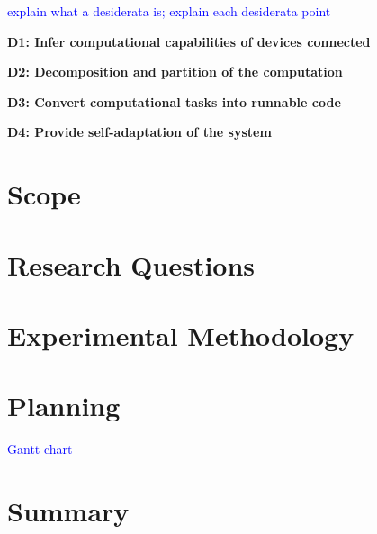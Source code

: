 \textcolor{blue}{explain what a desiderata is; explain each desiderata point}

\noindent
\textbf{D1: Infer computational capabilities of devices connected}

\noindent
\textbf{D2: Decomposition and partition of the computation}

\noindent
\textbf{D3: Convert computational tasks into runnable code}

\noindent
\textbf{D4: Provide self-adaptation of the system}

\section{Scope}\label{sec:scope}


\section{Research Questions}\label{sec:stat_research_questions}

\section{Experimental Methodology}\label{sec:exp_meth}

\section{Planning}\label{sec:planning}

\textcolor{blue}{Gantt chart}

\section{Summary}\label{sec:stat_summary}
